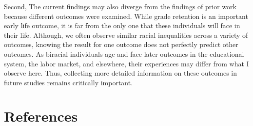 \documentclass[
  letterpaper,
  DIV=11,
  numbers=noendperiod]{scrartcl}
\begin{document}
Second, The current findings may also diverge from the findings of prior
work because different outcomes were examined. While grade retention is
an important early life outcome, it is far from the only one that these
individuals will face in their life. Although, we often observe similar
racial inequalities across a variety of outcomes, knowing the result for
one outcome does not perfectly predict other outcomes. As biracial
individuals age and face later outcomes in the educational system, the
labor market, and elsewhere, their experiences may differ from what I
observe here. Thus, collecting more detailed information on these
outcomes in future studies remains critically important.

\hypertarget{references}{%
\section*{References}\label{references}}
\end{document}
